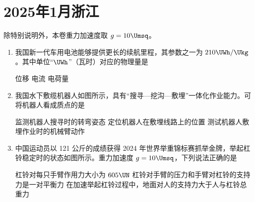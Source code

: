 \documentclass[\gkver]{gaokaozhenti}
\begin{document}
\chapter{2025年1月浙江}

除特别说明外，本卷重力加速度取 $g = 10\Umsq$。

\begin{enumerate}
\item
我国新一代车用电池能够提供更长的续航里程，其参数之一为 $210 \UWh/\Ukg$。其中单位“$\UWh$”（瓦时）对应的物理量是

{位移}
{电流}
{电荷量}


\item
我国水下敷缆机器人如图所示，具有“搜寻—挖沟—敷埋”一体化作业能力。可将机器人看成质点的是


{监测机器人搜寻时的转弯姿态}
{定位机器人在敷埋线路上的位置}
{测试机器人敷埋作业时的机械臂动作}


\item
中国运动员以 121 公斤的成绩获得 2024 年世界举重锦标赛抓举金牌，举起杠铃稳定时的状态如图所示。重力加速度 $g = 10 \Umsq$，下列说法正确的是


{杠铃对每只手臂作用力大小为 $605 \UN$}
{杠铃对手臂的压力和手臂对杠铃的支持力是一对平衡力}
{在加速举起杠铃过程中，地面对人的支持力大于人与杠铃总重力}


\end{enumerate}
\end{document}
